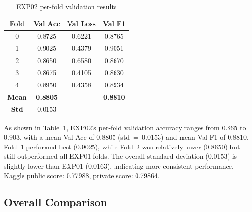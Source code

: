 \documentclass[10pt,twocolumn]{article}
\begin{document}
\begin{table}[h]
\centering
\caption{EXP02 per-fold validation results}
\label{tab:exp02}
\begin{tabular}{cccc}
\toprule
\textbf{Fold} & \textbf{Val Acc} & \textbf{Val Loss} & \textbf{Val F1} \\
\midrule
0 & 0.8725 & 0.6221 & 0.8765 \\
1 & 0.9025 & 0.4379 & 0.9051 \\
2 & 0.8650 & 0.6580 & 0.8670 \\
3 & 0.8675 & 0.4105 & 0.8630 \\
4 & 0.8950 & 0.4358 & 0.8934 \\
\midrule
\textbf{Mean} & \textbf{0.8805} & --- & \textbf{0.8810} \\
\textbf{Std}  & 0.0153          & --- & --- \\
\bottomrule
\end{tabular}
\end{table}

As shown in Table~\ref{tab:exp02}, EXP02's per-fold validation accuracy
ranges from 0.865 to 0.903, with a mean Val Acc of 0.8805
(std~=~0.0153) and mean Val F1 of 0.8810. Fold~1 performed best
(0.9025), while Fold~2 was relatively lower (0.8650) but still
outperformed all EXP01 folds. The overall standard deviation (0.0153)
is slightly lower than EXP01 (0.0163), indicating more consistent
performance. Kaggle public score: 0.77988, private score: 0.79864.

\subsection{Overall Comparison}

\begin{table}[h]
\centering
\caption{Comprehensive comparison of EXP01 vs.\ EXP02}
\label{tab:compare}
\end{table}
\end{document}
